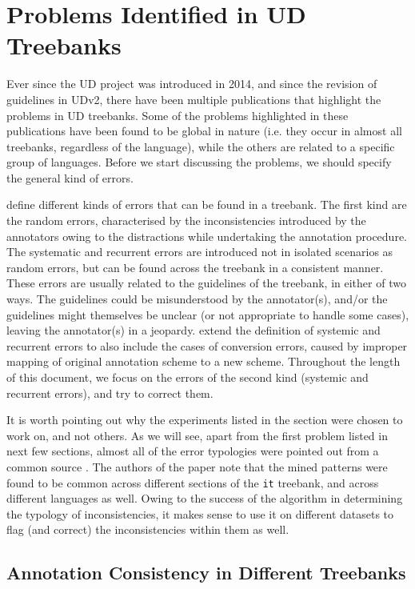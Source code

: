 \chapter{Problems Identified in UD Treebanks}
\label{sec:problems}

Ever since the UD project was introduced in 2014, and since the revision of guidelines in UDv2, there have been multiple publications that highlight the problems in UD treebanks. Some of the problems highlighted in these publications have been found to be global in nature (i.e. they occur in almost all treebanks, regardless of the language), while the others are related to a specific group of languages. Before we start discussing the problems, we should specify the general kind of errors.

\cite{error-types} define different kinds of errors that can be found in a treebank. The first kind are the random errors, characterised by the inconsistencies introduced by the annotators owing to the distractions while undertaking the annotation procedure. The systematic and recurrent errors are introduced not in isolated scenarios as random errors, but can be found across the treebank in a consistent manner. These errors are usually related to the guidelines of the treebank, in either of two ways. The guidelines could be misunderstood by the annotator(s), and/or the guidelines might themselves be unclear (or not appropriate to handle some cases), leaving the annotator(s) in a jeopardy. \cite{alzetta2017dangerous} extend the definition of systemic and recurrent errors to also include the cases of conversion errors, caused by improper mapping of original annotation scheme to a new scheme. Throughout the length of this document, we focus on the errors of the second kind (systemic and recurrent errors), and try to correct them.

It is worth pointing out why the experiments listed in the section were chosen to work on, and not others. As we will see, apart from the first problem listed in next few sections, almost all of the error typologies were pointed out from a common source \citep{alzetta2017dangerous}. The authors of the paper note that the mined patterns were found to be common across different sections of the \verb|it| treebank, and across different languages as well. Owing to the success of the algorithm in determining the typology of inconsistencies, it makes sense to use it on different datasets to flag (and correct) the inconsistencies within them as well.

\section{Annotation Consistency in Different Treebanks}
\label{sec:harmony}

